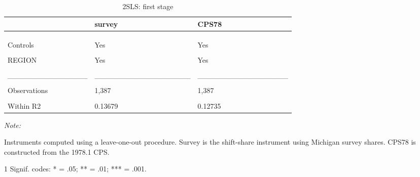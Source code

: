\begin{table}

\caption{\label{tab:base:out:2sls:stage1}2SLS: first stage}
\centering
\begin{threeparttable}
\begin{tabular}[t]{lll}
\toprule
  & survey & CPS78\\
\midrule
\cellcolor{gray!6}{Dependent Var.:} & \cellcolor{gray!6}{pe} & \cellcolor{gray!6}{pe}\\
\addlinespace
 &  & \\
\addlinespace
\cellcolor{gray!6}{Bartik} & \cellcolor{gray!6}{0.2478*** (0.0629)} & \cellcolor{gray!6}{0.4474** (0.1449)}\\
\addlinespace
Controls & Yes & Yes\\
\addlinespace
\cellcolor{gray!6}{Fixed-Effects:} & \cellcolor{gray!6}{------------------} & \cellcolor{gray!6}{-----------------}\\
\addlinespace
REGION & Yes & Yes\\
\addlinespace
\cellcolor{gray!6}{TIME} & \cellcolor{gray!6}{Yes} & \cellcolor{gray!6}{Yes}\\
\addlinespace
\_\_\_\_\_\_\_\_\_\_\_\_\_\_\_ & \_\_\_\_\_\_\_\_\_\_\_\_\_\_\_\_\_\_ & \_\_\_\_\_\_\_\_\_\_\_\_\_\_\_\_\_\\
\addlinespace
\cellcolor{gray!6}{S.E. type} & \cellcolor{gray!6}{Drisco.-Kra. (L=4)} & \cellcolor{gray!6}{Drisc.-Kra. (L=4)}\\
\addlinespace
Observations & 1,387 & 1,387\\
\addlinespace
\cellcolor{gray!6}{R2} & \cellcolor{gray!6}{0.80339} & \cellcolor{gray!6}{0.80124}\\
\addlinespace
Within R2 & 0.13679 & 0.12735\\
\bottomrule
\end{tabular}
\begin{tablenotes}
\item \textit{Note: } 
\item Instruments computed using a leave-one-out procedure. Survey is the shift-share instrument using Michigan survey shares. CPS78 is constructed from the 1978.1 CPS.
\item[1] Signif. codes: * = .05; ** = .01; *** = .001.
\end{tablenotes}
\end{threeparttable}
\end{table}
